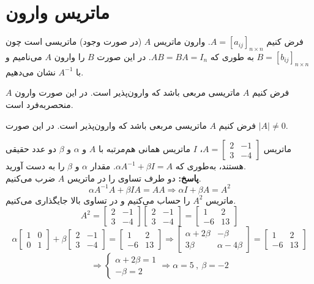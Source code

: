 \section{ماتریس وارون}
فرض کنیم
$A=[a_{ij}]_{n \times n}$.
وارون ماتریس $A$ (در صورت وجود) ماتریسی است چون
$B=[b_{ij}]_{n \times n}$
به طوری که
$AB=BA=I_n$.
در این صورت $B$ را وارون $A$ می‌نامیم و با
$A^{-1}$
نشان می‌دهیم.

\begin{theorem}
	فرض کنیم $A$ ماتریسی مربعی باشد که وارون‌پذیر است. در این صورت وارون $A$ منحصربه‌فرد است.
\end{theorem}

\begin{theorem}
	فرض کنیم $A$ ماتریسی مربعی باشد که وارون‌پذیر است. در این صورت
	$|A| \neq 0$.
\end{theorem}

\begin{example}
	ماتریس
	$A=
	\begin{bmatrix}
		2 & -1 \\
		3 & -4
	\end{bmatrix}$،
	$I$
	ماتریس همانی هم‌مرتبه با $A$ و
	$\alpha$ و $\beta$
	دو عدد حقیقی هستند، به‌طوری که
	$\alpha A^{-1} + \beta I = A$.
	مقدار
	$\alpha$ و $\beta$
	را به دست آورید. \\
	\textbf{پاسخ:}
	دو طرف تساوی را در ماتریس $A$ ضرب می‌کنیم.
	$$\alpha A^{-1}A + \beta IA = AA \Rightarrow \alpha I + \beta A = A^2$$
	ماتریس
	$A^2$
	را حساب می‌کنیم و در تساوی بالا جایگذاری می‌کنیم.
	\[
	A^2 = 
	\begin{bmatrix}
		2 & -1 \\
		3 & -4
	\end{bmatrix}
	\begin{bmatrix}
		2 & -1 \\
		3 & -4
	\end{bmatrix}
	=
	\begin{bmatrix}
		1 & 2 \\
		-6 & 13
	\end{bmatrix}
	\]
	\[
	\alpha
	\begin{bmatrix}
		1 & 0 \\
		0 & 1
	\end{bmatrix}
	+ \beta
	\begin{bmatrix}
		2 & -1 \\
		3 & -4
	\end{bmatrix}
	=
	\begin{bmatrix}
		1 & 2 \\
		-6 & 13
	\end{bmatrix}
	\Rightarrow
	\begin{bmatrix}
		\alpha + 2\beta & -\beta \\
		3\beta & \alpha -4\beta
	\end{bmatrix}
	=
	\begin{bmatrix}
		1 & 2 \\
		-6 & 13
	\end{bmatrix}
	\]
	\[
	\Rightarrow
	\begin{cases}
		\alpha + 2\beta = 1 \\
		-\beta = 2
	\end{cases}
	\Rightarrow
	\alpha = 5 \ , \ \beta = -2
	\]
\end{example}

